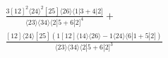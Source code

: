 \documentclass[varwidth, border=5pt]{standalone}
\begin{document}
\begin{my}
$\begin{gathered}
\scriptscriptstyle\frac{3[12]^2⟨24⟩^2[25]⟨26⟩⟨1|3+4|2]}{⟨23⟩⟨34⟩⟨2|5+6|2]^4}+\\
\scriptscriptstyle\frac{[12]⟨24⟩[25](1[12]⟨14⟩⟨26⟩-1⟨24⟩⟨6|1+5|2])}{⟨23⟩⟨34⟩⟨2|5+6|2]^3}\phantom{+}
\end{gathered}$
\end{my}
\end{document}
